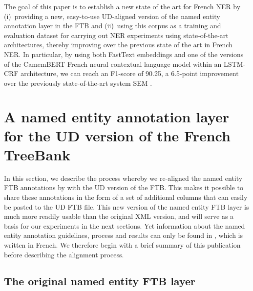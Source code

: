 The goal of this paper is to establish a new state of the art for French NER by (i)~providing a new, easy-to-use UD-aligned version of the named entity annotation layer in the FTB and (ii)~using this corpus as a training and evaluation dataset for carrying out NER experiments using state-of-the-art architectures, thereby improving over the previous state of the art in French NER. In particular, by using both FastText embeddings \cite{bojanowski-etal-2017-enriching} and one of the versions of the CamemBERT French neural contextual language model \cite{martin-etal-2020-camembert} within an LSTM-CRF architecture, we can reach an F1-score of 90.25, a 6.5-point improvement over the previously state-of-the-art system SEM \cite{dupont-2017-exploration}.



\section{A named entity annotation layer for the UD version of the French TreeBank}


In this section, we describe the process whereby we re-aligned the named entity FTB annotations by  with the UD version of the FTB. This makes it possible to share these annotations in the form of a set of additional columns that can easily be pasted to the UD FTB file. This new version of the named entity FTB layer is much more readily usable than the original XML version, and will serve as a basis for our experiments in the next sections.
Yet information about the named entity annotation guidelines, process and results can only be found in , which is written in French. We therefore begin with a brief summary of this publication before describing the alignment process.



\subsection{The original named entity FTB layer}
\label{subsec:originalannotations}


